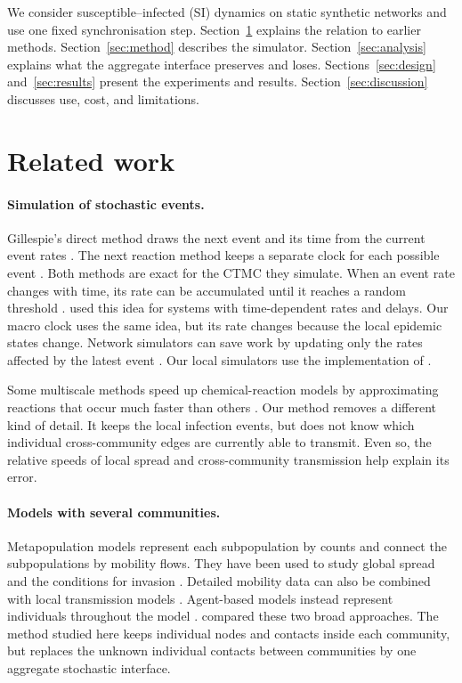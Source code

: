 We consider susceptible--infected (SI) dynamics on static synthetic networks and use one fixed synchronisation step. Section~\ref{sec:related} explains the relation to earlier methods. Section~\ref{sec:method} describes the simulator. Section~\ref{sec:analysis} explains what the aggregate interface preserves and loses. Sections~\ref{sec:design} and~\ref{sec:results} present the experiments and results. Section~\ref{sec:discussion} discusses use, cost, and limitations.

\clearpage

\section{Related work}
\label{sec:related}

\paragraph{Simulation of stochastic events.}
Gillespie's direct method draws the next event and its time from the current event rates \citep{gillespie1977exact}. The next reaction method keeps a separate clock for each possible event \citep{gibson2000}. Both methods are exact for the CTMC they simulate. When an event rate changes with time, its rate can be accumulated until it reaches a random threshold \citep{ethier1986}. \citet{anderson2007} used this idea for systems with time-dependent rates and delays. Our macro clock uses the same idea, but its rate changes because the local epidemic states change. Network simulators can save work by updating only the rates affected by the latest event \citep{vestergaard2015,kuryliak2025simulating}. Our local simulators use the implementation of \citet{kuryliak2025simulating}.

Some multiscale methods speed up chemical-reaction models by approximating reactions that occur much faster than others \citep{haseltine2002,cao2005slow}. Our method removes a different kind of detail. It keeps the local infection events, but does not know which individual cross-community edges are currently able to transmit. Even so, the relative speeds of local spread and cross-community transmission help explain its error.

\paragraph{Models with several communities.}
Metapopulation models represent each subpopulation by counts and connect the subpopulations by mobility flows. They have been used to study global spread and the conditions for invasion \citep{colizza2007reaction,colizza2008,balcan2009,balcan2010modeling}. Detailed mobility data can also be combined with local transmission models \citep{chang2021}. Agent-based models instead represent individuals throughout the model \citep{eubank2004,kerr2021}. \citet{ajelli2010} compared these two broad approaches. The method studied here keeps individual nodes and contacts inside each community, but replaces the unknown individual contacts between communities by one aggregate stochastic interface.

